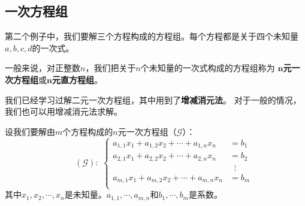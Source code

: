 \documentclass[12pt,UTF8,fontset=none]{ctexbook}
\begin{document}

\subsection{一次方程组}

第二个例子中，我们要解三个方程构成的方程组。每个方程都是关于四个未知量$a,b,c,d$的一次式。

一般来说，对正整数$n$，我们把关于$n$个未知量的一次式构成的方程组称为
$\boldsymbol{n}$\textbf{元一次方程组}或$\boldsymbol{n}$\textbf{元直方程组}。

我们已经学习过解二元一次方程组，其中用到了\textbf{增减消元法}。
对于一般的情况，我们也可以用增减消元法求解。

设我们要解由$m$个方程构成的$n$元一次方程组（$\mathcal{G}$）：
$$
\qquad (\mathcal{G}):\,\,
\left\{
    \begin{aligned}
        a_{1,1} x_1 + a_{1,2} x_2 + \cdots + a_{1,n} x_n &= b_1 \\
        a_{2,1} x_1 + a_{2,2} x_2 + \cdots + a_{2,n} x_n &= b_2 \\
        &\;\;\vdots \\
        a_{m,1} x_1 + a_{m,2} x_2 + \cdots + a_{m,n} x_n &= b_m \\
    \end{aligned}
\right.
$$
其中$x_1, x_2, \cdots , x_n$是未知量。$a_{1,1}, \cdots , a_{m,n}$和$b_1, \cdots , b_m$是系数。
\end{document}
